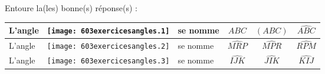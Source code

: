 Entoure la(les) bonne(s) réponse(s) :\par
\begin{tabular}{|lm{5cm}l|c|c|c|}
\hline
L'angle&\texttt{[image: 603exercicesangles.1]}&se nomme&$ABC$&$(ABC)$&$\widehat{ABC}$\\
\hline
L'angle&\texttt{[image: 603exercicesangles.2]}&se nomme&$\widehat{MRP}$&$\widehat{MPR}$&$\widehat{RPM}$\\
\hline
L'angle&\texttt{[image: 603exercicesangles.3]}&se nomme&$\widehat{IJK}$&$\widehat{JIK}$&$\widehat{KIJ}$\\
\hline
\end{tabular}

